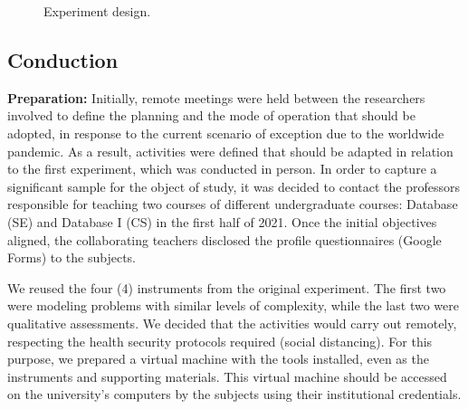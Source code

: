 \begin{figure}[!htb]
    \centering
    \caption{Experiment design.}
    \label{fig:designExp}
    
\end{figure}

\subsection{Conduction}
\label{ssec_experiments:preliminary_conduction}

\textbf{Preparation:} 
Initially, remote meetings were held between the researchers involved to define the planning and the mode of operation that should be adopted, in response to the current scenario of exception due to the worldwide pandemic.
As a result, activities were defined that should be adapted in relation to the first experiment, which was conducted in person.
In order to capture a significant sample for the object of study, it was decided to contact the professors responsible for teaching two courses of different undergraduate courses: Database (SE) and Database I (CS) in the first half of 2021.
Once the initial objectives aligned, the collaborating teachers disclosed the profile questionnaires (Google Forms) to the subjects.

We reused the four (4) instruments from the original experiment. 
The first two were modeling problems with similar levels of complexity, while the last two were qualitative assessments.
We decided that the activities would carry out remotely, respecting the health security protocols required (social distancing). 
For this purpose, we prepared a virtual machine with the tools installed, even as the instruments and supporting materials. 
This virtual machine should be accessed on the university's computers by the subjects using their institutional credentials.

